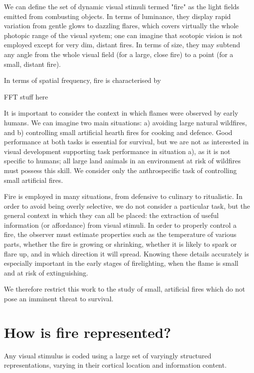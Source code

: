 \documentclass{jov}
\begin{document}
We can define the set of dynamic visual stimuli termed "fire" as the light fields emitted from combusting objects. In terms of luminance, they display rapid variation from gentle glows to dazzling flares, which covers virtually the whole photopic range of the visual system; one can imagine that scotopic vision is not employed except for very dim, distant fires. In terms of size, they may subtend any angle from the whole visual field (for a large, close fire) to a point (for a small, distant fire).

In terms of spatial frequency, fire is characterised by 

FFT stuff here

It is important to consider the context in which flames were observed by early humans. We can imagine two main situations: a) avoiding large natural wildfires, and b) controlling small artificial hearth fires for cooking and defence. Good performance at both tasks is essential for survival, but we are not as interested in visual development supporting task performance in situation a), as it is not specific to humans; all large land animals in an environment at risk of wildfires must possess this skill. We consider only the anthrospecific task of controlling small artificial fires.

Fire is employed in many situations, from defensive to culinary to ritualistic. In order to avoid being overly selective, we do not consider a particular task, but the general context in which they can all be placed: the extraction of useful information (or affordance) from visual stimuli. In order to properly control a fire, the observer must estimate properties such as the temperature of various parts, whether the fire is growing or shrinking, whether it is likely to spark or flare up, and in which direction it will spread. Knowing these details accurately is especially important in the early stages of firelighting, when the flame is small and at risk of extinguishing.

We therefore restrict this work to the study of small, artificial fires which do not pose an imminent threat to survival. 

\section{How is fire represented?}

Any visual stimulus is coded using a large set of varyingly structured representations, varying in their cortical location and information content.
\end{document}
